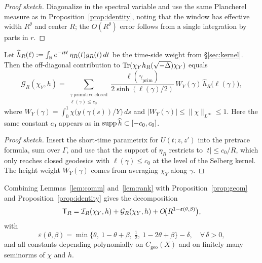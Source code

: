 \begin{proof}[Proof sketch]
Diagonalize in the spectral variable and use the same Plancherel measure as in Proposition~\ref{prop:identity}, noting that the window has effective width $R^\theta$ and center $R$; the $O(R^\theta)$ error follows from a single integration by parts in $r$.
\end{proof}

\begin{proposition}\label{prop:geom}
Let $\widehat h_R(\ell):=\int_{\mathbb{R}}e^{-it\ell}\, \eta_R(t) g_R(t)\,dt$ be the time-side weight from \S\ref{sec:kernel}.
Then the off-diagonal contribution to $\mathrm{Tr}(\chi_Y h_R(\sqrt{-\Delta})\chi_Y)$ equals
\[
\mathcal{G}_R(\chi_Y,h)
=\sum_{\substack{\gamma\ \mathrm{primitive\ closed}\\ \ell(\gamma)\le c_0}}
\frac{\ell(\gamma_{\mathrm{prim}})}{2\sinh(\ell(\gamma)/2)}\,
W_Y(\gamma)\,\widehat h_R\!\big(\ell(\gamma)\big),
\]
where $W_Y(\gamma)=\int_0^1 \chi\!\big(y(\gamma(s))/Y\big)\,ds$ and $|W_Y(\gamma)|\le \|\chi\|_{L^\infty}\le1$. Here the same constant $c_0$ appears as in $\operatorname{supp}\widehat h\subset[-c_0,c_0]$.
\end{proposition}

\begin{proof}[Proof sketch]
Insert the short-time parametrix for $U(t;z,z')$ into the pretrace formula, sum over $\Gamma$, and use that the support of $\eta_R$ restricts to $|t|\le c_0/R$, which only reaches closed geodesics with $\ell(\gamma)\le c_0$ at the level of the Selberg kernel. The height weight $W_Y(\gamma)$ comes from averaging $\chi_Y$ along $\gamma$.
\end{proof}

Combining Lemmas~\ref{lem:comm} and~\ref{lem:rank} with Proposition~\ref{prop:geom} and Proposition~\ref{prop:identity} gives the decomposition
\[
\mathsf{T}_R=\mathcal{I}_R(\chi_Y,h)+\mathcal{G}_R(\chi_Y,h)+O\!\big(R^{1-\varepsilon(\theta,\beta)}\big),
\]
with
\[
\varepsilon(\theta,\beta)=\min\Big\{\theta,\ 1-\theta+\beta,\ \tfrac12,\ 1-2\theta+\beta\Big\}-\delta,\quad \forall\,\delta>0,
\]
and all constants depending polynomially on $C_{\mathrm{geo}}(X)$ and on finitely many seminorms of $\chi$ and $h$.
